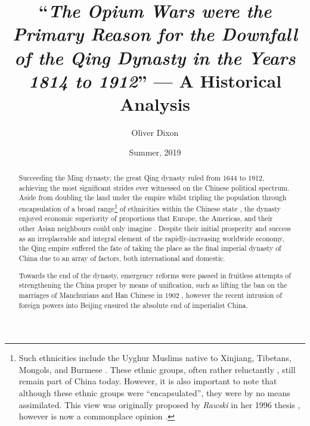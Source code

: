 \documentclass[a4paper,oneside]{article}
\title{``\emph{The Opium Wars were the Primary Reason for the Downfall of the
        Qing Dynasty in the Years 1814 to 1912}'' --- A Historical Analysis}
\author{Oliver Dixon}
\date{Summer, 2019}
\begin{document}
\clearpage\maketitle
\thispagestyle{titlehdr}
\pagestyle{stdhdr}

\vspace*{-1.5em}
\begin{figure}[h!]
	\centering
        \def\svgwidth{0.5\linewidth}
	
\end{figure}
\vspace*{-0.5em}

\begin{abstract}

        Succeeding the Ming dynasty, the great Qing dynasty ruled from 1644 to
        1912, achieving the most significant strides ever witnessed on the
        Chinese political spectrum. Aside from doubling the land under the
        empire \autocites{Turchin:2006}{Goldstone:1995} whilst tripling the
        population through encapsulation of a broad range\footnote{Such
        ethnicities include the Uyghur Muslims native to Xinjiang, Tibetans,
        Mongols, and Burmese \autocite{Chia:1993}. These ethnic groups, often
        rather reluctantly \autocites{Teichman:2002}{Smith:2009}{Dwyer:2005},
        still remain part of China today. However, it is also important to note
        that although these ethnic groups were ``encapsulated'', they were by no
        means assimilated.  This view was originally proposed by \textit{Rawski}
        in her 1996 thesis \autocite{Rawski:1996}, however is now a commonplace
        opinion \autocite{Hou:2014}.} of ethnicities within the Chinese state
        \autocite{Rowe:2012}, the dynasty enjoyed economic superiority of
        proportions that Europe, the Americas, and their other Asian neighbours
        could only imagine \autocite{Maddison:2007}. Despite their initial
        prosperity and success as an irreplaceable and integral element of the
        rapidly-increasing worldwide economy, the Qing empire suffered the fate
        of taking the place as the final imperial dynasty of China due to an
        array of factors, both international and domestic.

        Towards the end of the dynasty, emergency reforms were passed in
        fruitless attempts of strengthening the China proper by means of
        unification, such as lifting the ban on the marriages of Manchurians and
        Han Chinese in 1902 \autocite{Rhoads:2000}, however the recent intrusion
        of foreign powers into Beijing ensured the absolute end of imperialist
        China.


\end{abstract}
\end{document}
